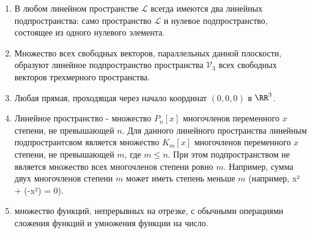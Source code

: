 \begin{enumerate}
    \item В любом линейном пространстве $\mathcal{L}$ всегда имеются два линейных подпространства: само пространство $\mathcal{L}$ и нулевое подпространство, состоящее из одного нулевого элемента.
    \item Множество всех свободных векторов, параллельных данной плоскости, образуют линейное подпространство пространства $\mathcal{V}_3$ всех свободных векторов трехмерного пространства.
    \item Любая прямая, проходящая через начало координат $(0, 0, 0)$ в $\RR^3$.
    \item Линейное пространство - множество $P_n[x]$ многочленов переменного $x$ степени, не превышающей $n$. Для данного линейного пространства линейным подпространтсвом является множество $K_m[x]$ многочленов переменного $x$ степени, не превышающей $m$, где $m \leq n$. При этом подпространством не является множество всех многочленов степени ровно $m$. Например, сумма двух многочленов степени $m$ может иметь степень меньше $m$ (например, x² + (-x²) = 0).
    \item множество функций, непрерывных на отрезке, с обычными операциями сложения функций и умножения функции на число.
\end{enumerate}
